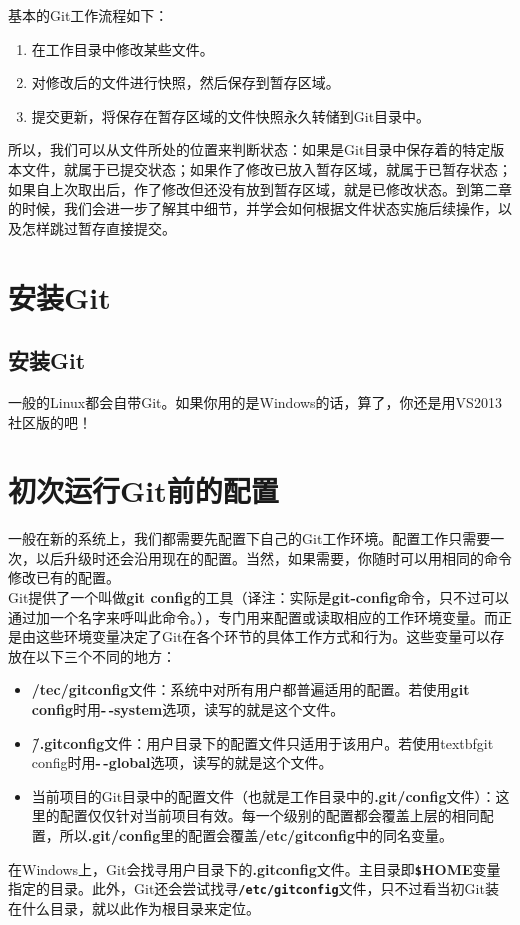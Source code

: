 \documentclass{book}
\begin{document}
	基本的Git工作流程如下：\\
	\begin{enumerate}
		\item 在工作目录中修改某些文件。\\
		\item 对修改后的文件进行快照，然后保存到暂存区域。\\
		\item 提交更新，将保存在暂存区域的文件快照永久转储到Git目录中。\\
	\end{enumerate}
	所以，我们可以从文件所处的位置来判断状态：如果是Git目录中保存着的特定版本文件，就属于已提交状态；如果作了修改已放入暂存区域，就属于已暂存状态；如果自上次取出后，作了修改但还没有放到暂存区域，就是已修改状态。到第二章的时候，我们会进一步了解其中细节，并学会如何根据文件状态实施后续操作，以及怎样跳过暂存直接提交。\\
	\section{安装Git}
	\subsection{安装Git}
		一般的Linux都会自带Git。如果你用的是Windows的话，算了，你还是用VS2013社区版的吧！\\
	
	\section{初次运行Git前的配置}
	一般在新的系统上，我们都需要先配置下自己的Git工作环境。配置工作只需要一次，以后升级时还会沿用现在的配置。当然，如果需要，你随时可以用相同的命令修改已有的配置。\\
	Git提供了一个叫做\textbf{git config}的工具（译注：实际是\textbf{git-config}命令，只不过可以通过加一个名字来呼叫此命令。），专门用来配置或读取相应的工作环境变量。而正是由这些环境变量决定了Git在各个环节的具体工作方式和行为。这些变量可以存放在以下三个不同的地方：\\
	\begin{itemize}
		\item \textbf{/tec/gitconfig}文件：系统中对所有用户都普遍适用的配置。若使用\textbf{git config}时用\textbf{-\,-system}选项，读写的就是这个文件。\\
		\item \textbf{\~/.gitconfig}文件：用户目录下的配置文件只适用于该用户。若使用textbf{git config}时用\textbf{-\,-global}选项，读写的就是这个文件。\\
		\item 当前项目的Git目录中的配置文件（也就是工作目录中的\textbf{.git/config}文件）：这里的配置仅仅针对当前项目有效。每一个级别的配置都会覆盖上层的相同配置，所以\textbf{.git/config}里的配置会覆盖\textbf{/etc/gitconfig}中的同名变量。\\
	\end{itemize}
	在Windows上，Git会找寻用户目录下的\textbf{.gitconfig}文件。主目录即\textbf{\verb|$|HOME}变量指定的目录。此外，Git还会尝试找寻\textbf{\verb|/etc/gitconfig|}文件，只不过看当初Git装在什么目录，就以此作为根目录来定位。\\
\end{document}

